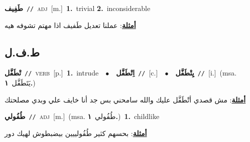 \documentclass[10pt,a4paper,twoside]{article} %
\begin{document}
\begin{multicols}{2}
{\setlength\topsep{0pt}\textbf{\foreignlanguage{arabic}{طَفِيف}}\ {\color{gray}\texttt{//}\color{black}}\ \textsc{adj}\ [m.]\ \textbf{1.}~trivial  \textbf{2.}~inconsiderable\  \begin{flushright}\color{gray}\foreignlanguage{arabic}{\textbf{\underline{\foreignlanguage{arabic}{أمثلة}}}: عملنا تعديل طَفيف اذا مهتم تشوفه هيه}\end{flushright}\color{black}} \vspace{2mm}

\vspace{-3mm}
\subsection*{\color{blue}\foreignlanguage{arabic}{ط.ف.ل}\color{blue}{}} 

{\setlength\topsep{0pt}\textbf{\foreignlanguage{arabic}{تْطَفَّل}}\ {\color{gray}\texttt{//}\color{black}}\ \textsc{verb}\ [p.]\ \textbf{1.}~intrude\ \ $\bullet$\ \ \setlength\topsep{0pt}\textbf{\foreignlanguage{arabic}{اِتْطَفَّل}}\ {\color{gray}\texttt{//}\color{black}}\ [c.]\ \ $\bullet$\ \ \setlength\topsep{0pt}\textbf{\foreignlanguage{arabic}{يِتْطَفَّل}}\ {\color{gray}\texttt{//}\color{black}}\ [i.]\ \color{gray}(msa. \foreignlanguage{arabic}{يَتَطَفَّل}~\foreignlanguage{arabic}{\textbf{١.}})\color{black}\  \begin{flushright}\color{gray}\foreignlanguage{arabic}{\textbf{\underline{\foreignlanguage{arabic}{أمثلة}}}: مش قصدي أتْطَفَّل عليك والله سامحني بس جد أنا خايف علي وبدي مصلحتك}\end{flushright}\color{black}} \vspace{2mm}

{\setlength\topsep{0pt}\textbf{\foreignlanguage{arabic}{طُفُولي}}\ {\color{gray}\texttt{//}\color{black}}\ \textsc{adj}\ [m.]\ \color{gray}(msa. \foreignlanguage{arabic}{طُفُولي}~\foreignlanguage{arabic}{\textbf{١.}})\color{black}\ \textbf{1.}~childlike\  \begin{flushright}\color{gray}\foreignlanguage{arabic}{\textbf{\underline{\foreignlanguage{arabic}{أمثلة}}}: بحسهم كثير طُفُولييين بيضبطوش لهيك دور}\end{flushright}\color{black}} \vspace{2mm}


\end{multicols}
\end{document}
